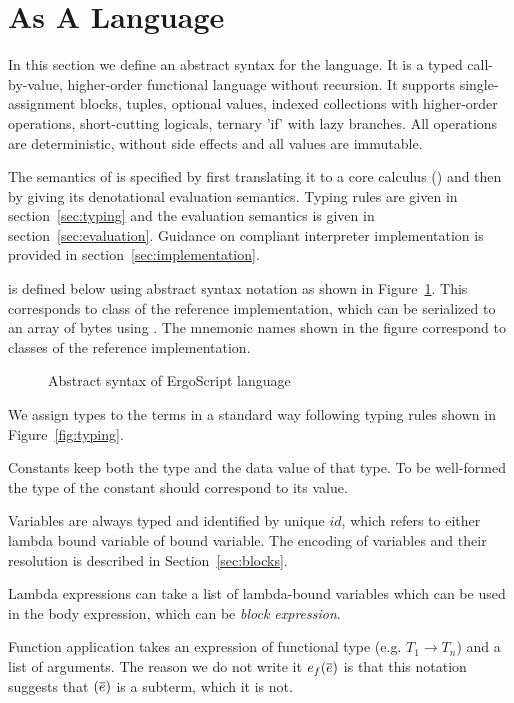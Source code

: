 \section{\langname As A Language}
\label{sec:language}

In this section we define an abstract syntax for the \langname language. It is a typed
call-by-value, higher-order functional language without recursion. It supports
single-assignment blocks, tuples, optional values, indexed collections with
higher-order operations, short-cutting logicals, ternary 'if' with lazy branches. All
operations are deterministic, without side effects and all values are immutable.

The semantics of \langname is specified by first translating it to a core calculus
(\corelang) and then by giving its denotational evaluation semantics. Typing rules are
given in section~\ref{sec:typing} and the evaluation semantics is given in
section~\ref{sec:evaluation}. Guidance on compliant interpreter implementation is
provided in section~\ref{sec:implementation}.

\langname is defined below using abstract syntax notation as shown in
Figure~\ref{fig:language}. This corresponds to  class of the reference
implementation, which can be serialized to an array of bytes using
. The mnemonic names shown in the figure correspond to classes of
the reference implementation.

\begin{figure}[h]
    \footnotesize
    
    \caption{Abstract syntax of ErgoScript language}
    \label{fig:language}
\end{figure}
    
We assign types to the terms in a standard way following typing rules shown
in Figure~\ref{fig:typing}.

Constants keep both the type and the data value of that type. To be
well-formed the type of the constant should correspond to its value.

Variables are always typed and identified by unique $id$, which refers to
either lambda bound variable of  bound variable. The encoding of
variables and their resolution is described in Section~\ref{sec:blocks}.

Lambda expressions can take a list of lambda-bound variables which can be
used in the body expression, which can be \emph{block expression}. 

Function application takes an expression of functional type (e.g. $T_1 \to
T_n$) and a list of arguments. The reason we do not write it $e_f(\overline{e})$
is that this notation suggests that $(\overline{e})$ is a subterm, which it is not.

